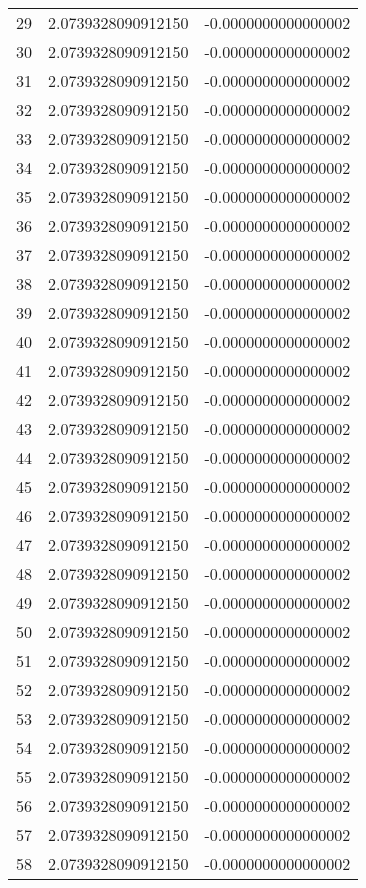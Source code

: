 \begin{tabular}{lrr}
29 & 2.0739328090912150 & -0.0000000000000002 \\
30 & 2.0739328090912150 & -0.0000000000000002 \\
31 & 2.0739328090912150 & -0.0000000000000002 \\
32 & 2.0739328090912150 & -0.0000000000000002 \\
33 & 2.0739328090912150 & -0.0000000000000002 \\
34 & 2.0739328090912150 & -0.0000000000000002 \\
35 & 2.0739328090912150 & -0.0000000000000002 \\
36 & 2.0739328090912150 & -0.0000000000000002 \\
37 & 2.0739328090912150 & -0.0000000000000002 \\
38 & 2.0739328090912150 & -0.0000000000000002 \\
39 & 2.0739328090912150 & -0.0000000000000002 \\
40 & 2.0739328090912150 & -0.0000000000000002 \\
41 & 2.0739328090912150 & -0.0000000000000002 \\
42 & 2.0739328090912150 & -0.0000000000000002 \\
43 & 2.0739328090912150 & -0.0000000000000002 \\
44 & 2.0739328090912150 & -0.0000000000000002 \\
45 & 2.0739328090912150 & -0.0000000000000002 \\
46 & 2.0739328090912150 & -0.0000000000000002 \\
47 & 2.0739328090912150 & -0.0000000000000002 \\
48 & 2.0739328090912150 & -0.0000000000000002 \\
49 & 2.0739328090912150 & -0.0000000000000002 \\
50 & 2.0739328090912150 & -0.0000000000000002 \\
51 & 2.0739328090912150 & -0.0000000000000002 \\
52 & 2.0739328090912150 & -0.0000000000000002 \\
53 & 2.0739328090912150 & -0.0000000000000002 \\
54 & 2.0739328090912150 & -0.0000000000000002 \\
55 & 2.0739328090912150 & -0.0000000000000002 \\
56 & 2.0739328090912150 & -0.0000000000000002 \\
57 & 2.0739328090912150 & -0.0000000000000002 \\
58 & 2.0739328090912150 & -0.0000000000000002 \\

\end{tabular}
